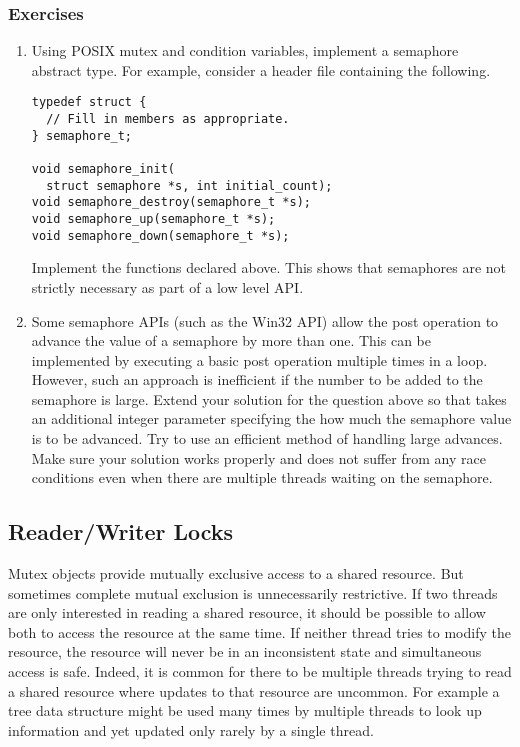 \subsubsection*{Exercises}

\begin{enumerate}

\item Using POSIX mutex and condition variables, implement a semaphore abstract type. For
  example, consider a header file containing the following.

\begin{lstlisting}
typedef struct {
  // Fill in members as appropriate.
} semaphore_t;

void semaphore_init(
  struct semaphore *s, int initial_count);
void semaphore_destroy(semaphore_t *s);
void semaphore_up(semaphore_t *s);
void semaphore_down(semaphore_t *s);
\end{lstlisting}

Implement the functions declared above. This shows that semaphores are not strictly necessary as
part of a low level API.

\item Some semaphore APIs (such as the Win32 API) allow the post operation to advance the value
  of a semaphore by more than one. This can be implemented by executing a basic post operation
  multiple times in a loop. However, such an approach is inefficient if the number to be added
  to the semaphore is large. Extend your solution for the question above so that
   takes an additional integer parameter specifying the how much the
  semaphore value is to be advanced. Try to use an efficient method of handling large advances.
  Make sure your solution works properly and does not suffer from any race conditions even when
  there are multiple threads waiting on the semaphore.

\end{enumerate}

\subsection{Reader/Writer Locks}
\label{subsec:reader-writer}

Mutex objects provide mutually exclusive access to a shared resource. But sometimes complete
mutual exclusion is unnecessarily restrictive. If two threads are only interested in reading a
shared resource, it should be possible to allow both to access the resource at the same time. If
neither thread tries to modify the resource, the resource will never be in an inconsistent state
and simultaneous access is safe. Indeed, it is common for there to be multiple threads trying to
read a shared resource where updates to that resource are uncommon. For example a tree data
structure might be used many times by multiple threads to look up information and yet updated
only rarely by a single thread.

